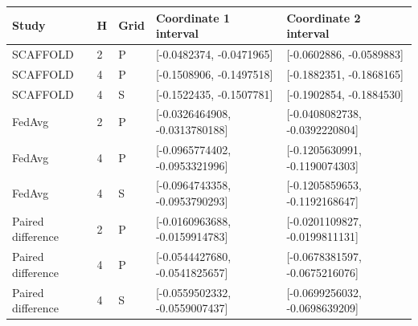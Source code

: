 \begin{tabular}{lllll}
Study & H & Grid & Coordinate 1 interval & Coordinate 2 interval \\
\hline
SCAFFOLD & 2 & P & [-0.0482374, -0.0471965] & [-0.0602886, -0.0589883] \\
SCAFFOLD & 4 & P & [-0.1508906, -0.1497518] & [-0.1882351, -0.1868165] \\
SCAFFOLD & 4 & S & [-0.1522435, -0.1507781] & [-0.1902854, -0.1884530] \\
FedAvg & 2 & P & [-0.0326464908, -0.0313780188] & [-0.0408082738, -0.0392220804] \\
FedAvg & 4 & P & [-0.0965774402, -0.0953321996] & [-0.1205630991, -0.1190074303] \\
FedAvg & 4 & S & [-0.0964743358, -0.0953790293] & [-0.1205859653, -0.1192168647] \\
Paired difference & 2 & P & [-0.0160963688, -0.0159914783] & [-0.0201109827, -0.0199811131] \\
Paired difference & 4 & P & [-0.0544427680, -0.0541825657] & [-0.0678381597, -0.0675216076] \\
Paired difference & 4 & S & [-0.0559502332, -0.0559007437] & [-0.0699256032, -0.0698639209] \\
\end{tabular}
